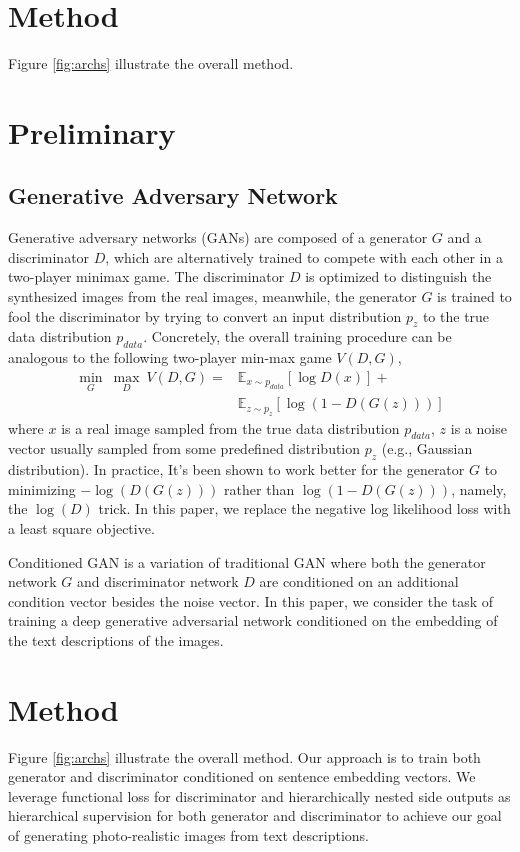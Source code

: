 \documentclass[10pt,twocolumn,letterpaper]{article}
\begin{document}
\section{Method}
Figure \ref{fig:archs} illustrate the overall method.


\section{Preliminary}
\subsection{Generative Adversary Network}
Generative adversary networks (GANs) are composed of a generator $G$ and a discriminator $D$, which are alternatively trained to compete with each other in a two-player minimax game. The discriminator $D$ is optimized to distinguish the synthesized images from the real images, meanwhile, the generator $G$ is trained to fool the discriminator by trying to convert an input distribution $p_z$ to the true data distribution $p_{data}$. Concretely, the overall training procedure can be analogous to the following two-player min-max game $V(D, G)$,
\begin{equation}
\label{game}
\begin{split}
\underset{G}{\min}\ \underset{D}{\max}\ V(D, G) =  &\mathbb{E}_{x\sim p_{data}}[\log D(x)] +  \\
&\mathbb{E}_{z\sim p_{z}}[\log (1-D(G(z)))]		   
\end{split}
\end{equation}
where $x$ is a real image sampled from the true data distribution $p_{data}$, $z$ is a noise vector usually sampled from some predefined distribution $p_{z}$ (e.g., Gaussian distribution).
In practice, It's been shown to work better for the generator $G$ to minimizing $-\log(D(G(z)))$ rather than $\log(1-D(G(z)))$, namely, the $\log(D)$ trick.
In this paper, we replace the negative log likelihood loss with a least square objective\cite{lsgan}. 

Conditioned GAN \cite{isola2016image} is a variation of traditional GAN where both the generator network $G$ and discriminator network $D$ are conditioned on an additional condition vector besides the noise vector. In this paper, we consider the task of training a deep  generative adversarial network conditioned on the embedding of the text descriptions of the images.

\section{Method}
Figure \ref{fig:archs} illustrate the overall method.
Our approach is to train both generator and discriminator conditioned on sentence embedding vectors. We leverage functional loss for discriminator and hierarchically nested side outputs as hierarchical supervision for both generator and discriminator to achieve our goal of generating photo-realistic images from text descriptions.  
\end{document}
